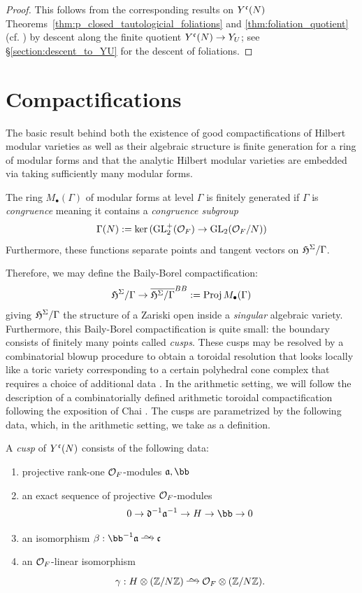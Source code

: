 \documentclass[main.tex]{subfiles}
\begin{document}
{\begin{proof}
This follows from the corresponding results on $Y^{\mathfrak{c}}(N)$ Theorems~\ref{thm:p_closed_tautologicial_foliations} and \ref{thm:foliation_quotient} (cf. \cite[Theorem~3.2.2 and Proposition~3.3.3]{goren_deshalit:foliations_shimura}) by descent along the finite quotient $Y^{\mathfrak{c}}(N) \to Y_U$; see \S\ref{section:descent_to_YU} for the descent of foliations.
\end{proof}

\section{Compactifications}

The basic result behind both the existence of good compactifications of Hilbert modular varieties as well as their algebraic structure is finite generation for a ring of modular forms and that the analytic Hilbert modular varieties are embedded via taking sufficiently many modular forms.

\begin{theorem}
The ring $M_{\bullet}(\Gamma)$ of modular forms at level $\Gamma$ is finitely generated if $\Gamma$ is \textit{congruence} meaning it contains a \textit{congruence subgroup} 
\[ \Gamma(N) := \ker{(\mathrm{GL}^+_2(\mathcal{O}_F) \to \mathrm{GL}_2(\mathcal{O}_F/N))} \]
Furthermore, these functions separate points and tangent vectors on $\mathfrak{H}^{\Sigma} / \Gamma$.
\end{theorem}

Therefore, we may define the Baily-Borel compactification:
\[ \mathfrak{H}^{\Sigma} / \Gamma  \to \overline{\mathfrak{H}^{\Sigma} / \Gamma}^{BB} := \operatorname{\mathrm{Proj}}{M_{\bullet}(\Gamma)} \]
giving $\mathfrak{H}^{\Sigma} / \Gamma$ the structure of a Zariski open inside a \textit{singular} algebraic variety. Furthermore, this Baily-Borel compactification is quite small: the boundary consists of finitely many points called \textit{cusps}. These cusps may be resolved by a combinatorial blowup procedure to obtain a toroidal resolution that looks locally like a toric variety corresponding to a certain polyhedral cone complex
that requires a choice of additional data \cite{AMRT:smooth_compactifications}. In the arithmetic setting, we will follow the description of a combinatorially defined arithmetic toroidal compactification following the exposition of Chai \cite{chai:arithmetic_compactifications}. The cusps are parametrized by the following data, which, in the arithmetic setting, we take as a definition.

\begin{defn}
A \textit{cusp} of $Y^{\mathfrak{c}}(N)$ consists of the following data:
\begin{enumerate}
\item projective rank-one $\mathcal{O}_F$-modules $\aa, \bb$
\item an exact sequence of projective $\mathcal{O}_F$-modules
\[ 0 \to \dd^{-1} \aa^{-1} \to H \to \bb \to 0 \]
\item an isomorphism $\beta : \bb^{-1} \aa \iso \cc$
\item an $\mathcal{O}_F$-linear isomorphism
\[ \gamma : H \ot (\Z / N \Z) \iso \cO_F \ot (\Z / N \Z). \]
\end{enumerate}
\end{defn}

}
\end{document}
